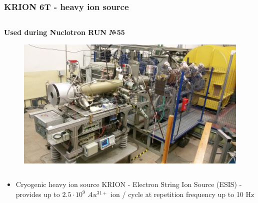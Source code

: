 \documentclass[dvipsnames] {beamer}
\begin{document}
\begin{frame}
  \frametitle{\bf \centering KRION 6T - heavy ion source}
  \begin{columns}[c]
    \begin{block}{\bf \centering Used during Nuclotron RUN №55}
      \begin{figure}[H]
        \includegraphics[width=1.\linewidth]{krion6T.jpg} 
      \end{figure}
    \end{block}
      \end{columns}
    {\bf 
    \begin{block}{}
      \begin{itemize}
      \item Cryogenic heavy ion source KRION - Electron String Ion Source (ESIS) -
        provides up to $2.5 \cdot 10^{9}$ $Au^{31+}$ ion / cycle at repetition frequency up to 10 Hz
      \end{itemize}
    \end{block}
    } 
\end{frame}
\end{document}
